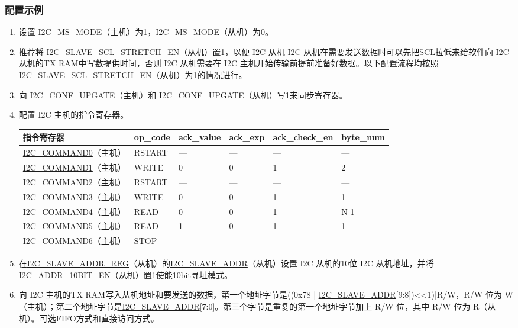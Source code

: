 \documentclass[main\_\_CN.tex]{subfiles}
\begin{document}
\subsubsection{配置示例}
\begin{enumerate}
\item 设置 \hyperref[fielddesc:I2CMSMODE]{I2C\_MS\_MODE}（主机）为1，\hyperref[fielddesc:I2CMSMODE]{I2C\_MS\_MODE}（从机）为0。
\item 推荐将 \hyperref[fielddesc:I2CSLAVESCLSTRETCHEN]{I2C\_SLAVE\_SCL\_STRETCH\_EN}（从机）置1，以便 I2C 从机 I2C 从机在需要发送数据时可以先把SCL拉低来给软件向 I2C 从机的TX RAM中写数提供时间，否则 I2C 从机需要在 I2C 主机开始传输前提前准备好数据。以下配置流程均按照\hyperref[fielddesc:I2CSLAVESCLSTRETCHEN]{I2C\_SLAVE\_SCL\_STRETCH\_EN}（从机）为1的情况进行。 
\item 向 \hyperref[fielddesc:I2CCONFUPGATE]{I2C\_CONF\_UPGATE}（主机）和 \hyperref[fielddesc:I2CCONFUPGATE]{I2C\_CONF\_UPGATE}（从机）写1来同步寄存器。
\item 配置 I2C 主机的指令寄存器。
\begin{longtable}{ | p{4cm} | p{2cm} | p{2cm} | p{2cm} |p{2cm} | p{2cm} |}
\hline\rowcolor{lightgray}
指令寄存器& op\_code & ack\_value&ack\_exp&ack\_check\_en&byte\_num  \\ \hline
\hyperref[fielddesc:I2CCOMMAND0]{I2C\_COMMAND0}（主机）& RSTART& ---&---&---&---  \\ \hline
\hyperref[fielddesc:I2CCOMMAND1]{I2C\_COMMAND1}（主机）& WRITE& 0&0&1&2  \\ \hline
\hyperref[fielddesc:I2CCOMMAND2]{I2C\_COMMAND2}（主机）& RSTART& ---&---&---&---  \\ \hline
\hyperref[fielddesc:I2CCOMMAND3]{I2C\_COMMAND3}（主机）& WRITE& 0&0&1&1  \\ \hline
\hyperref[fielddesc:I2CCOMMAND4]{I2C\_COMMAND4}（主机）& READ& 0&0&1&N-1  \\ \hline
\hyperref[fielddesc:I2CCOMMAND5]{I2C\_COMMAND5}（主机）& READ& 1&0&1&1  \\ \hline
\hyperref[fielddesc:I2CCOMMAND6]{I2C\_COMMAND6}（主机）& STOP& ---&---&---&---  \\ \hline
\end{longtable}

\item 在\hyperref[regdesc:I2CSLAVEADDRREG]{I2C\_SLAVE\_ADDR\_REG}（从机）的\hyperref[fielddesc:I2CSLAVEADDR]{I2C\_SLAVE\_ADDR}（从机）设置 I2C 从机的10位 I2C 从机地址，并将 \hyperref[fielddesc:I2CADDR10BITEN]{I2C\_ADDR\_10BIT\_EN}（从机）置1使能10bit寻址模式。
\item 向 I2C 主机的TX RAM写入从机地址和要发送的数据，第一个地址字节是((0x78 | \hyperref[fielddesc:I2CSLAVEADDR]{I2C\_SLAVE\_ADDR}[9:8])<<1)|R/W，R/W 位为 W（主机）；第二个地址字节是\hyperref[fielddesc:I2CSLAVEADDR]{I2C\_SLAVE\_ADDR}[7:0]。第三个字节是重复的第一个地址字节加上 R/W 位，其中 R/W 位为 R（从机）。可选FIFO方式和直接访问方式。


\end{enumerate}
\end{document}
